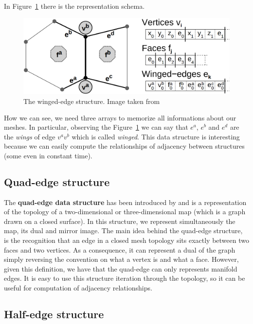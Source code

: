 In Figure~\ref{fig:winged-edge} there is the representation schema.

\begin{figure}[htb] %
   \centering
   \includegraphics[width=0.60\linewidth]{images/winged-edge.png}
   \caption[The winged-edge structure]{The winged-edge structure. Image taken from~\cite{Campagna}}
   \label{fig:winged-edge}
\end{figure}

How we can see, we need three arrays to memorize all informations about our meshes. In particular, observing the Figure~\ref{fig:winged-edge} we can say that $e^a$, $e^b$ and $e^d$ are the \textit{wings} of edge $v^{a}v^{b}$ which is called \textit{winged}. This data structure is interesting because we can easily compute the relationships of adjacency between structures (some even in constant time).


\subsection{Quad-edge structure}

The \textbf{quad-edge data structure} has been introduced by \cite{Guibas} and is a representation of the topology of a two-dimensional or three-dimensional map (which is a graph drawn on a closed surface). In this structure, we represent simultaneously the map, its dual and mirror image. The main idea behind the quad-edge structure, is the recognition that an edge in a closed mesh topology sits exactly between two faces and two vertices. As a consequence, it can represent a dual of the graph simply reversing the convention on what a vertex is and what a face. However, given this definition, we have that the quad-edge can only represents manifold edges. It is easy to use this structure iteration through the topology, so it can be useful for computation of adjacency relationships.

\subsection{Half-edge structure}

